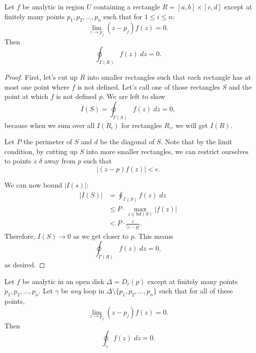 \documentclass[notes]{subfile}
\begin{document}
\begin{theorem} 
    Let $f$ be analytic in region $U$ containing a rectangle
    $R = [a,b] \times [c,d]$ except at finitely many points
    $p_1, p_2, \ldots, p_n$ such that for $1 \le i \le n$:
    \[ \lim_{z \to p_j} (z-p_j) f(z) = 0.\]
    Then
    \[ \oint_{\Gamma(R)} f(z) \; dz = 0. \]
\end{theorem}

\begin{proof}
    First, let's cut up $R$ into smaller rectangles such
    that each rectangle has at most one point
    where $f$ is not defined.
    Let's call one of those rectangles $S$ and the point
    at which $f$ is not defined $p$.
    We are left to show
    \[ I(S) = \oint_{\Gamma(S)} f(z) \; dz = 0, \]
    because when we sum over all $I(R_i)$ for
    rectangles $R_i$, we will get $I(R)$.

    \noindent
    Let $P$ the perimeter of $S$ and $d$ be the diagonal
    of $S$.
    Note that by the limit condition, by cutting 
    up $S$ into more smaller rectangles, 
    we can restrict ourselves to points $z$ $\delta$
    away from $p$ such that
    \[ |(z-p)f(z)| < \epsilon. \tag{1} \]

    We can now bound $|I(s)|$:
    \begin{align*}
        |I(S)| &= \oint_{\Gamma(S)} f(z) \; dz \\
        &\le P \cdot \max_{z \in \text{bd}(S)} |f(z)| 
        \tag{ML Theorem}\\
        &< P \cdot \frac{\epsilon}{|z-p|}.
    \end{align*}
    Therefore, $I(S) \to 0$ as we get closer to $p$.
    This means
    \[ \oint_{\Gamma(R)} f(z) \; dz = 0, \]
    as desired.
\end{proof}

\begin{theorem}
    Let $f$ be analytic in an open disk $\Delta = D_r(p)$
    except at finitely many points $p_1, p_2, \ldots, p_n$.
    Let $\gamma$ be \textit{any} loop in $\Delta \setminus 
    \{ p_1, p_2, \ldots, p_n \}$ such that for all of these points,
    \[ \lim_{z \to p_j} (z-p_j)f(z) = 0.\]
    Then
    \[ \oint_{\gamma} f(z) \; dz = 0. \]
\end{theorem}
\end{document}
